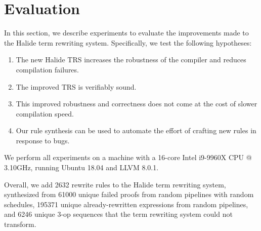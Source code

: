 \documentclass[sigplan,10pt,review,anonymous]{acmart}\settopmatter{printfolios=true,printccs=false,printacmref=false}
\newcommand{\NumRulesSynthesized}{{\color{red} 2632}\xspace}
\newcommand{\NumOpSequences}{{\color{red} 6246}\xspace}
\newcommand{\NumFailureExamples}{{\color{red} 61000}\xspace}
\newcommand{\NumSimplifiedExpressions}{{\color{red} 195371}\xspace}
\begin{document}
\section{Evaluation}
In this section, we describe experiments to evaluate the improvements made to the Halide term rewriting system.  Specifically, we
test the following hypotheses:
\begin{enumerate}
\item The new Halide TRS increases the robustness of the compiler and reduces compilation failures.
\item The improved TRS is verifiably sound.
\item This improved robustness and correctness does not come at the cost of slower compilation speed.
\item Our rule synthesis can be used to automate the effort of crafting new rules in response to bugs.
\end{enumerate}

We perform all experiments on a machine with a 16-core Intel i9-9960X CPU @ 3.10GHz,
running Ubuntu 18.04 and LLVM 8.0.1.



Overall, we add \NumRulesSynthesized rewrite rules to the Halide term rewriting system, synthesized
from \NumFailureExamples unique failed proofs from random pipelines with random schedules, \NumSimplifiedExpressions
unique already-rewritten expressions from random pipelines, and \NumOpSequences unique 3-op sequences
that the term rewriting system could not transform.  
\end{document}
